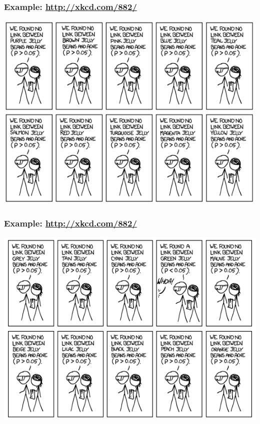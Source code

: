 \documentclass[handout]{beamer}\usepackage{graphicx, color}
\numberwithin{equation}{section}
\begin{document}
\begin{frame}
\frametitle{Example: \url{http://xkcd.com/882/}}
 \includegraphics{../../fig/xkcd2.png}
\end{frame}

\begin{frame}
\frametitle{Example: \url{http://xkcd.com/882/}}
 \includegraphics{../../fig/xkcd3.png}
\end{frame}
\end{document}

